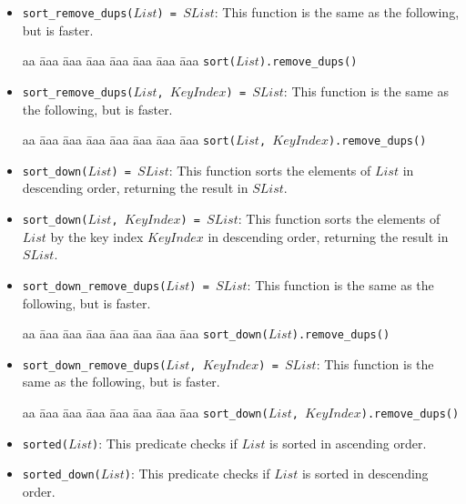 \begin{itemize}
\item \texttt{sort\_remove\_dups($List$) = $SList$}: This function is the same as the following, but is faster.
\begin{tabbing}
aa \= aaa \= aaa \= aaa \=aaa \= aaa \= aaa \= aaa \kill
\> \texttt{sort($List$).remove\_dups()}
\end{tabbing}

\item \texttt{sort\_remove\_dups($List$, $KeyIndex$) = $SList$}: This function is the same as the following, but is faster.
\begin{tabbing}
aa \= aaa \= aaa \= aaa \=aaa \= aaa \= aaa \= aaa \kill
\> \texttt{sort($List$, $KeyIndex$).remove\_dups()}
\end{tabbing}

\item \texttt{sort\_down($List$) = $SList$}: This function sorts the elements of $List$ in descending order, returning the result in $SList$.

\item \texttt{sort\_down($List$, $KeyIndex$) = $SList$}: This function sorts the elements of $List$ by the key index $KeyIndex$ in descending order, returning the result in $SList$.

\item \texttt{sort\_down\_remove\_dups($List$) = $SList$}: This function is the same as the following, but is faster.
\begin{tabbing}
aa \= aaa \= aaa \= aaa \=aaa \= aaa \= aaa \= aaa \kill
\> \texttt{sort\_down($List$).remove\_dups()}
\end{tabbing}

\item \texttt{sort\_down\_remove\_dups($List$, $KeyIndex$) = $SList$}: This function is the same as the following, but is faster.
\begin{tabbing}
aa \= aaa \= aaa \= aaa \=aaa \= aaa \= aaa \= aaa \kill
\> \texttt{sort\_down($List$, $KeyIndex$).remove\_dups()}
\end{tabbing}

\item \texttt{sorted($List$)}: This predicate checks if $List$ is sorted in ascending order.

\item \texttt{sorted\_down($List$)}: This predicate checks if $List$ is sorted in descending order.


\end{itemize}
